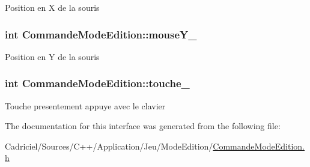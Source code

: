 Position en X de la souris \hypertarget{class_commande_mode_edition_a6128370123ce4b6e6fb8571c953241e4}{
\subsubsection[{mouse\-Y\-\_\-}]{\setlength{\rightskip}{0pt plus 5cm}int Commande\-Mode\-Edition\-::mouse\-Y\-\_\-\hspace{0.3cm}{\ttfamily [protected]}}}\label{class_commande_mode_edition_a6128370123ce4b6e6fb8571c953241e4}
Position en Y de la souris \hypertarget{class_commande_mode_edition_a3a522c03034a54eb01178e8c8af9a8db}{
\subsubsection[{touche\-\_\-}]{\setlength{\rightskip}{0pt plus 5cm}int Commande\-Mode\-Edition\-::touche\-\_\-\hspace{0.3cm}{\ttfamily [protected]}}}\label{class_commande_mode_edition_a3a522c03034a54eb01178e8c8af9a8db}
Touche presentement appuye avec le clavier 

The documentation for this interface was generated from the following file\-:\begin{DoxyCompactItemize}
\item 
Cadriciel/\-Sources/\-C++/\-Application/\-Jeu/\-Mode\-Edition/\hyperlink{_commande_mode_edition_8h}{Commande\-Mode\-Edition.\-h}\end{DoxyCompactItemize}
